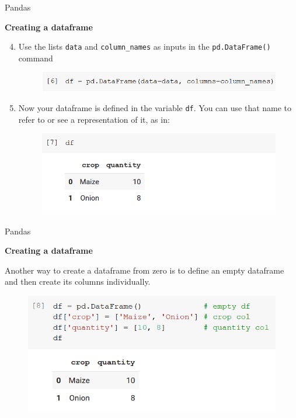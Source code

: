 \documentclass[aspectratio=169]{beamer}
\begin{document}
\begin{frame}{Pandas}

	\textbf{Creating a dataframe}

	\begin{enumerate}
		\setcounter{enumi}{3}
		\item Use the lists \texttt{data} and \texttt{column\_names} as inputs in the \texttt{pd.DataFrame()} command
		\begin{figure}
			\includegraphics[width=0.8\linewidth]{img/dataframe_definition.png}
		\end{figure}
		\item Now your dataframe is defined in the variable \texttt{df}. You can use that name to refer to or see a representation of it, as in:
		\begin{figure}
			\includegraphics[width=0.8\linewidth]{img/df.png}
		\end{figure}
	\end{enumerate}

\end{frame}

\begin{frame}{Pandas}

	\textbf{Creating a dataframe}

	Another way to create a dataframe from zero is to define an empty dataframe and then create its columns individually.

	\begin{figure}
		\includegraphics[width=0.8\linewidth]{img/df_definition2.png}
	\end{figure}

\end{frame}
\end{document}
